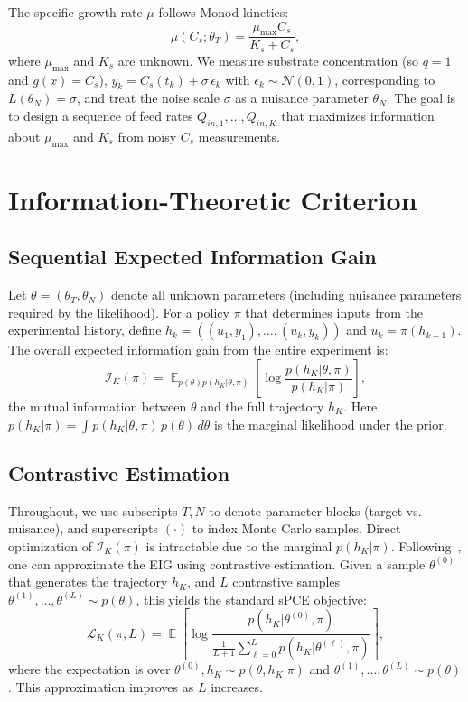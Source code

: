 \documentclass[conference]{IEEEtran}
\DeclareMathOperator{\E}{\mathbb{E}}
\begin{document}
The specific growth rate $\mu$ follows Monod kinetics:
\begin{equation}
\mu(C_s; \theta_T) = \frac{\mu_{\max} C_s}{K_s + C_s},
\end{equation}
where $\mu_{\max}$ and $K_s$ are unknown.
We measure substrate concentration (so $q=1$ and $g(x)=C_s$), $y_k = C_s(t_k) + \sigma\,\epsilon_k$ with $\epsilon_k \sim \mathcal{N}(0,1)$, corresponding to $L(\theta_N)=\sigma$, and treat the noise scale $\sigma$ as a nuisance parameter $\theta_N$.
The goal is to design a sequence of feed rates $Q_{in,1}, \ldots, Q_{in,K}$ that maximizes information about $\mu_{\max}$ and $K_s$ from noisy $C_s$ measurements.

\section{Information-Theoretic Criterion}

\subsection{Sequential Expected Information Gain}
Let $\theta = (\theta_T, \theta_N)$ denote all unknown parameters (including nuisance parameters required by the likelihood).
For a policy $\pi$ that determines inputs from the experimental history, define
$h_k = ((u_1, y_1), \ldots, (u_k, y_k))$ and $u_k = \pi(h_{k-1})$.
The overall expected information gain from the entire experiment is:
\begin{equation}
\mathcal{I}_K(\pi) = \E_{p(\theta)p(h_K|\theta,\pi)}\left[\log \frac{p(h_K|\theta,\pi)}{p(h_K|\pi)}\right],
\end{equation}
the mutual information between $\theta$ and the full trajectory $h_K$.
Here $p(h_K|\pi) = \int p(h_K|\theta,\pi)\,p(\theta)\,d\theta$ is the marginal likelihood under the prior.

\subsection{Contrastive Estimation}
Throughout, we use subscripts $T,N$ to denote parameter blocks (target vs.
nuisance), and superscripts $(\cdot)$ to index Monte Carlo samples.
Direct optimization of $\mathcal{I}_K(\pi)$ is intractable due to the marginal $p(h_K|\pi)$. Following~\citet{foster2021}, one can approximate the EIG using contrastive estimation. Given a sample $\theta^{(0)}$ that generates the trajectory $h_K$, and $L$ contrastive samples $\theta^{(1)},\ldots,\theta^{(L)} \sim p(\theta)$, this yields the standard sPCE objective:
\begin{equation}
\mathcal{L}_K(\pi, L) = \E\left[\log \frac{p(h_K|\theta^{(0)},\pi)}{\frac{1}{L+1}\sum_{\ell=0}^{L} p(h_K|\theta^{(\ell)},\pi)}\right],
\end{equation}
where the expectation is over $\theta^{(0)}, h_K \sim p(\theta, h_K|\pi)$ and $\theta^{(1)},\ldots,\theta^{(L)} \sim p(\theta)$. This approximation improves as $L$ increases.
\end{document}
